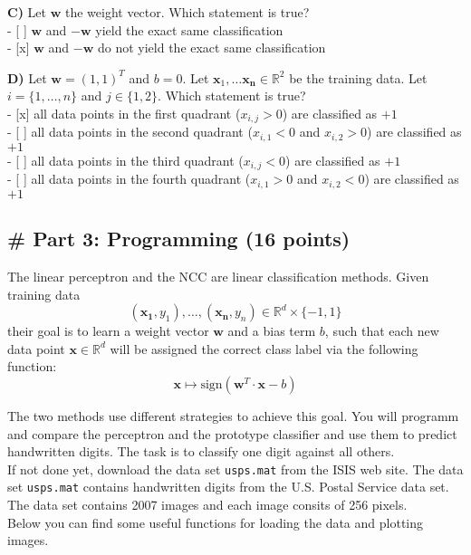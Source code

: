 \documentclass[11pt]{article}
\begin{document}
    \textbf{C)} Let \(\mathbf{w}\) the weight vector. Which statement is
true?\\
- {[} {]} \(\mathbf{w}\) and \(\mathbf{-w}\) yield the exact same
classification\\
- {[}x{]} \(\mathbf{w}\) and \(\mathbf{-w}\) do not yield the exact same
classification

    \textbf{D)} Let \(\mathbf{w} = (1,1)^T\) and \(b = 0\). Let
\(\mathbf{x}_1, \ldots \mathbf{x_n} \in \mathbb{R}^2\) be the training
data. Let \(i = \{1, \ldots ,n \}\) and \(j \in \{1, 2\}\). Which
statement is true?\\
- {[}x{]} all data points in the first quadrant (\(x_{i,j} > 0\)) are
classified as \(+1\)\\
- {[} {]} all data points in the second quadrant (\(x_{i,1} < 0\) and
\(x_{i,2} > 0\)) are classified as \(+1\)\\
- {[} {]} all data points in the third quadrant (\(x_{i,j} < 0\)) are
classified as \(+1\)\\
- {[} {]} all data points in the fourth quadrant (\(x_{i,1} > 0\) and
\(x_{i,2} < 0\)) are classified as \(+1\)

    \subsection{\# Part 3: Programming (16
points)}\label{part-3-programming-16-points}

The linear perceptron and the NCC are linear classification methods.
Given training data
\[(\mathbf{x_1}, y_1),\ldots, ( \mathbf{x_n}, y_n ) \in \mathbb{R}^d \times \{-1,1\}\]
their goal is to learn a weight vector \(\mathbf{w}\) and a bias term
\(b\), such that each new data point \(\mathbf{x} \in \mathbb{R}^d\)
will be assigned the correct class label via the following function:
\[\mathbf x \mapsto  \mbox{sign}(\mathbf w^T \cdot \mathbf x - b)\]

The two methods use different strategies to achieve this goal. You will
programm and compare the perceptron and the prototype classifier and use
them to predict handwritten digits. The task is to classify one digit
against all others.\\
If not done yet, download the data set \texttt{usps.mat} from the ISIS
web site. The data set \texttt{usps.mat} contains handwritten digits
from the U.S. Postal Service data set. The data set contains 2007 images
and each image consits of 256 pixels.\\
Below you can find some useful functions for loading the data and
plotting images.
\end{document}
